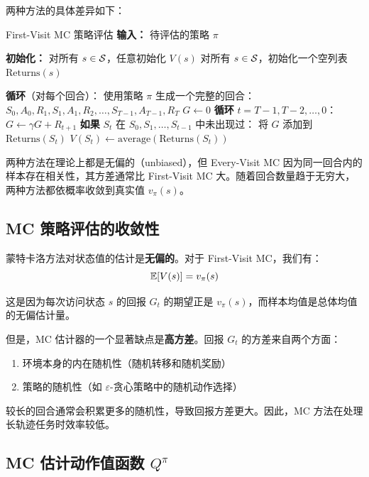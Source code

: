 两种方法的具体差异如下：

\begin{myformula}
\end{myformula}

\begin{myalgorithm}{First-Visit MC 策略评估}
\textbf{输入：} 待评估的策略 $\pi$

\textbf{初始化：}
\quad 对所有 $s \in \mathcal{S}$，任意初始化 $V(s)$
\quad 对所有 $s \in \mathcal{S}$，初始化一个空列表 $\text{Returns}(s)$

\textbf{循环}（对每个回合）：
\quad 使用策略 $\pi$ 生成一个完整的回合：$S_0, A_0, R_1, S_1, A_1, R_2, \ldots, S_{T-1}, A_{T-1}, R_T$
\quad $G \leftarrow 0$
\quad \textbf{循环} $t = T-1, T-2, \ldots, 0$：
\quad \quad $G \leftarrow \gamma G + R_{t+1}$
\quad \quad \textbf{如果} $S_t$ 在 $S_0, S_1, \ldots, S_{t-1}$ 中未出现过：
\quad \quad \quad 将 $G$ 添加到 $\text{Returns}(S_t)$
\quad \quad \quad $V(S_t) \leftarrow \text{average}(\text{Returns}(S_t))$
\end{myalgorithm}

\begin{remark}
两种方法在理论上都是无偏的（unbiased），但 Every-Visit MC 因为同一回合内的样本存在相关性，其方差通常比 First-Visit MC 大。随着回合数量趋于无穷大，两种方法都依概率收敛到真实值 $v_{\pi}(s)$。
\end{remark}

\subsection{MC 策略评估的收敛性}

蒙特卡洛方法对状态值的估计是\textbf{无偏的}。对于 First-Visit MC，我们有：
$$\mathbb{E}[V(s)] = v_{\pi}(s)$$

这是因为每次访问状态 $s$ 的回报 $G_t$ 的期望正是 $v_{\pi}(s)$，而样本均值是总体均值的无偏估计量。

但是，MC 估计器的一个显著缺点是\textbf{高方差}。回报 $G_t$ 的方差来自两个方面：
\begin{enumerate}
    \item 环境本身的内在随机性（随机转移和随机奖励）
    \item 策略的随机性（如 $\varepsilon$-贪心策略中的随机动作选择）
\end{enumerate}

较长的回合通常会积累更多的随机性，导致回报方差更大。因此，MC 方法在处理长轨迹任务时效率较低。

\subsection{MC 估计动作值函数 $Q^{\pi}$}

